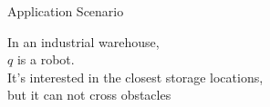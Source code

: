 \begin{frame}{Application Scenario}
\begin{minipage}{.5\textwidth}
\small In an industrial warehouse,\\
{\color{red}$q$} is a robot.\\
It's interested in the closest storage locations,\\
but it can not cross obstacles
\end{minipage}%
\begin{minipage}{.5\textwidth}
\begin{adjustbox}{max totalsize={.9\textwidth}{.9\textheight}, right}

\end{adjustbox}
\end{minipage}
\end{frame}